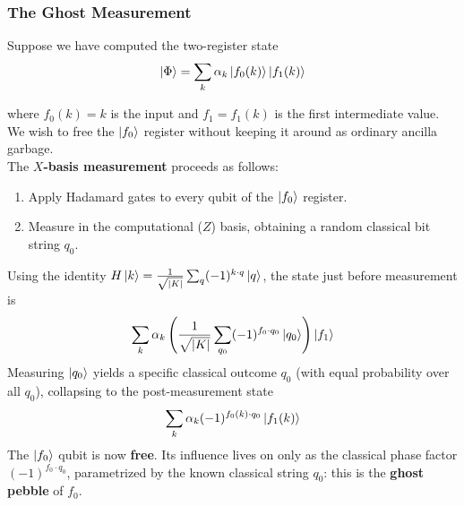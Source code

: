 \subsubsection{The Ghost Measurement}
Suppose we have computed the two-register state
\begin{equation}
    \ket{\Phi} = \sum_k \alpha_k \ket{f_0(k)} \ket{f_1(k)}
\end{equation}
 
where $f_0(k) = k$ is the input and $f_1 = f_1(k)$  is the first intermediate value. We wish to free the $\ket{f_0}$ register without keeping it around as ordinary ancilla garbage. \\

The $X$\textbf{-basis measurement} proceeds as follows:
\begin{enumerate}
    \item Apply Hadamard gates to every qubit of the $\ket{f_0}$ register.
    \item Measure in the computational ($Z$) basis, obtaining a random classical bit string $q_0$.
\end{enumerate}
Using the identity $H\ket{k} = \frac{1}{\sqrt{\abs{K}}} \sum_q (-1)^{k \cdot q} \ket{q}$, the state just before measurement is
\begin{equation}
    \sum_k \alpha_k \left(\frac{1}{\sqrt{\abs{K}}} \sum_{q_0} (-1)^{f_0 \cdot q_0} \ket{q_0} \right) \ket{f_1}
\end{equation}
Measuring $\ket{q_0}$ yields a specific classical outcome $q_0$ (with equal probability over all $q_0$), collapsing to the post-measurement state
\begin{equation}
    \sum_k \alpha_k (-1)^{f_0(k) \cdot q_0} \ket{f_1(k)}
\end{equation}
The $\ket{f_0}$ qubit is now \textbf{free}. Its influence lives on only as the classical phase factor $(-1)^{f_0 \cdot q_0}$, parametrized by the known classical string $q_0$: this is the \textbf{ghost pebble} of $f_0$. \\

